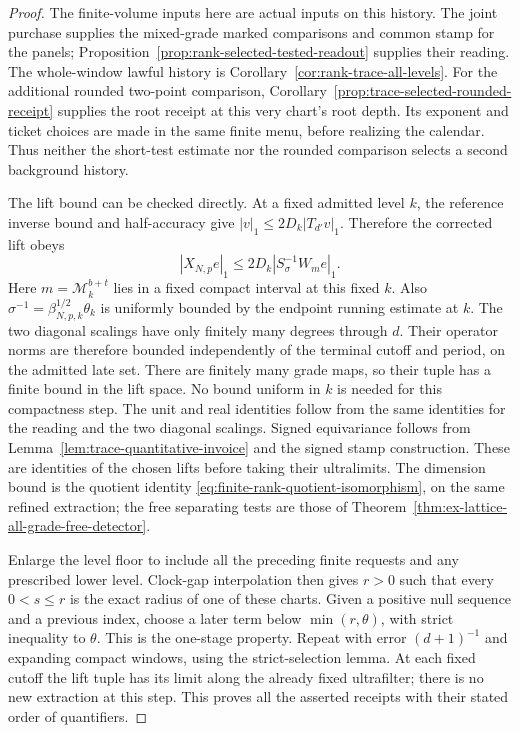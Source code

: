 \begin{proof}
The finite-volume inputs here are actual inputs on this history.
The joint purchase supplies the mixed-grade marked comparisons and
common stamp for the panels; Proposition~\ref{prop:rank-selected-tested-readout}
supplies their reading. The whole-window lawful history is
Corollary~\ref{cor:rank-trace-all-levels}. For the additional rounded
two-point comparison, Corollary~\ref{prop:trace-selected-rounded-receipt}
supplies the root receipt at this very chart's root depth. Its exponent
and ticket choices are made in the same finite menu, before realizing
the calendar. Thus neither the short-test estimate nor the rounded
comparison selects a second background history.

The lift bound can be checked directly. At a fixed admitted level $k$,
the reference inverse bound and half-accuracy give
$|v|_1\le2D_k|T_{d'}v|_1$. Therefore the corrected lift obeys
\[
 |X_{N,p}e|_1\le2D_k|S_\sigma^{-1}W_me|_1.
\]
Here $m=\mathcal M_k^{b+t}$ lies in a fixed compact interval at
this fixed $k$. Also
$\sigma^{-1}=\beta_{N,p,k}^{1/2}\theta_k$ is uniformly bounded by
the endpoint running estimate at $k$. The two diagonal scalings have
only finitely many degrees through $d$. Their operator norms are
therefore bounded independently of the terminal cutoff and period,
on the admitted late set. There are finitely many grade maps, so their
tuple has a finite bound in the lift space. No bound uniform in $k$
is needed for this compactness step.
The unit and real identities follow from the same identities for the
reading and the two diagonal scalings. Signed equivariance follows
from Lemma~\ref{lem:trace-quantitative-invoice} and the signed stamp
construction. These are identities of the chosen lifts before taking
their ultralimits. The dimension bound is the quotient identity
\eqref{eq:finite-rank-quotient-isomorphism}, on the same refined
extraction; the free separating tests are those of
Theorem~\ref{thm:ex-lattice-all-grade-free-detector}.

Enlarge the level floor to include all the preceding finite requests
and any prescribed lower level. Clock-gap interpolation then gives
$r>0$ such that every $0<s\le r$ is the exact radius of one of these
charts. Given a positive null sequence and a previous index, choose a
later term below $\min(r,\theta)$, with strict inequality to $\theta$.
This is the one-stage property. Repeat with error $(d+1)^{-1}$ and
expanding compact windows, using the strict-selection lemma. At each
fixed cutoff the lift tuple has its limit along the already fixed
ultrafilter; there is no new extraction at this step. This proves all
the asserted receipts with their stated order of quantifiers.
\end{proof}


